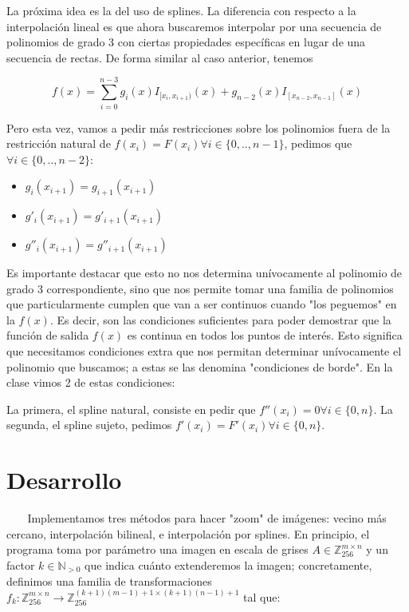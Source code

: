 \documentclass{article}
\begin{document}
La próxima idea es la del uso de splines. La diferencia con respecto a la interpolación lineal es que ahora buscaremos interpolar por una secuencia de polinomios de grado 3 con ciertas propiedades específicas en lugar de una secuencia de rectas. De forma similar al caso anterior, tenemos

$$f(x) = \sum_{i=0}^{n-3} g_i(x) I_{[x_i, x_{i+1})}(x) + g_{n-2}(x) I_{[x_{n-2}, x_{n-1}]}(x)$$

Pero esta vez, vamos a pedir más restricciones sobre los polinomios fuera de la restricción natural de $f(x_i) = F(x_i) \forall i \in \{0, .., n-1\}$, pedimos que $\forall i \in \{0, .., n-2\}$:

\begin{itemize}
\item $g_i(x_{i+1}) = g_{i+1}(x_{i+1})$
\item $g'_i(x_{i+1}) = g'_{i+1}(x_{i+1})$
\item $g''_i(x_{i+1}) = g''_{i+1}(x_{i+1})$
\end{itemize}

Es importante destacar que esto no nos determina unívocamente al polinomio de grado 3 correspondiente, sino que nos permite tomar una familia de polinomios que particularmente cumplen que van a ser continuos cuando "los peguemos" en la $f(x)$. Es decir, son las condiciones suficientes para poder demostrar que la función de salida $f(x)$ es continua en todos los puntos de interés. Esto significa que necesitamos condiciones extra que nos permitan determinar unívocamente el polinomio que buscamos; a estas se las denomina "condiciones de borde". En la clase vimos 2 de estas condiciones:

La primera, el spline natural, consiste en pedir que $f''(x_i) = 0 \forall i \in \{0, n\}$.
La segunda, el spline sujeto, pedimos $f'(x_i) = F'(x_i) \forall i \in \{0, n\}$.

\section{Desarrollo}

$\ $ $\ $ $\ $ $\ $Implementamos tres métodos para hacer "zoom" de imágenes: vecino más cercano, interpolación bilineal, e interpolación por splines. En principio, el programa toma por parámetro una imagen en escala de grises $A \in \mathbb{Z}_{256}^{m \times n}$ y un factor $k \in \mathbb{N}_{>0}$ que indica cuánto extenderemos la imagen; concretamente, definimos una familia de transformaciones $f_k : \mathbb{Z}_{256}^{m \times n} \to \mathbb{Z}_{256}^{(k+1)(m-1)+1 \times (k+1)(n-1)+1}$ tal que:
\end{document}
